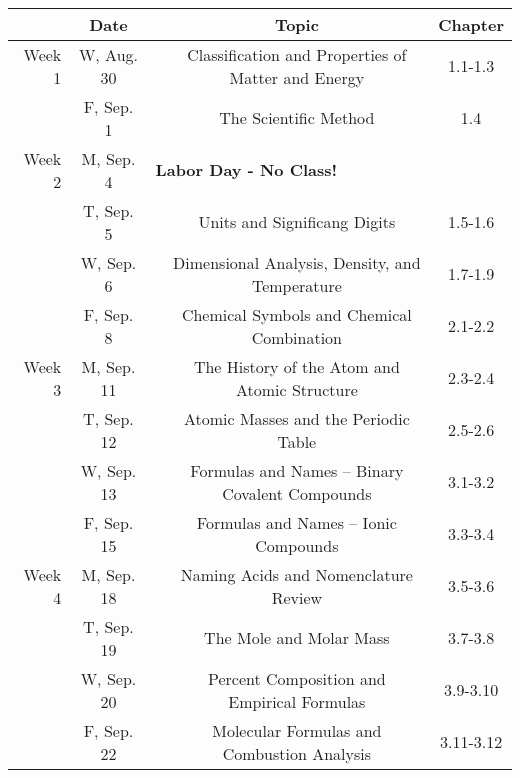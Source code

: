 \documentclass[12pt, letterpaper]{article}
\begin{document}
~

\noindent
\begin{tabular}{rcccc}
& Date && Topic & Chapter\\
\midrule
Week 1 & W, Aug. 30&& Classification and Properties of Matter and Energy & 1.1-1.3\\
& F, Sep. 1&& The Scientific Method & 1.4\\
\midrule
Week 2 & M, Sep. 4& \multicolumn{3}{l}{\textbf{Labor Day - No Class!}}\\
& T, Sep. 5&& Units and Significang Digits & 1.5-1.6\\
& W, Sep. 6&& Dimensional Analysis, Density, and Temperature & 1.7-1.9\\
& F, Sep. 8&& Chemical Symbols and Chemical Combination & 2.1-2.2\\
\midrule
Week 3 & M, Sep. 11&& The History of the Atom and Atomic Structure & 2.3-2.4\\
& T, Sep. 12&& Atomic Masses and the Periodic Table & 2.5-2.6\\
& W, Sep. 13&& Formulas and Names -- Binary Covalent Compounds & 3.1-3.2\\
& F, Sep. 15&& Formulas and Names -- Ionic Compounds & 3.3-3.4\\
\midrule
Week 4 & M, Sep. 18&& Naming Acids and Nomenclature Review & 3.5-3.6\\
& T, Sep. 19&& The Mole and Molar Mass & 3.7-3.8\\
& W, Sep. 20&& Percent Composition and Empirical Formulas & 3.9-3.10\\
& F, Sep. 22&& Molecular Formulas and Combustion Analysis & 3.11-3.12\\
\end{tabular}
\end{document}
